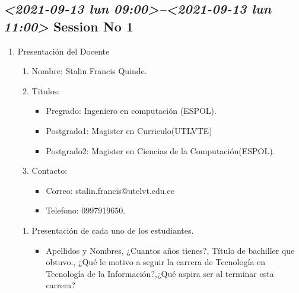 \documentclass[presentation, aspectratio=54]{beamer}
\begin{document}
\subsection{\textit{<2021-09-13 lun 09:00>--<2021-09-13 lun 11:00> } Session No 1}
\label{sec:org1f472ad}
\begin{enumerate}
\item Presentación del Docente
\label{sec:org7ccea2e}
\begin{enumerate}
\item Nombre: Stalin Francis Quinde.
\item Titulos:
\begin{itemize}
\item Pregrado: Ingeniero en computación (ESPOL).
\item Postgrado1: Magister en
Curriculo(UTLVTE)
\item Postgrado2: Magister en Ciencias de la Computación(ESPOL).
\end{itemize}
\item Contacto:
\begin{itemize}
\item Correo: stalin.francis@utelvt.edu.ec
\item Telefono: 0997919650.
\end{itemize}
\end{enumerate}
\begin{enumerate}
\item Presentación de cada uno de los estudiantes.
\label{sec:org1f5daa4}
\begin{itemize}
\item Apellidos y Nombres, ¿Cuantos años tienes?, Título de bachiller que obtuvo., ¿Qué le motivo a  seguir la carrera de Tecnología en Tecnología de la Información?,¿Qué aspira ser al terminar esta carrera?
\end{itemize}
\end{enumerate}
\end{enumerate}
\end{document}
